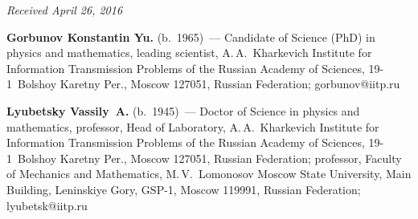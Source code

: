 \begin{multicols}{2}
{{ }
 }

\end{multicols}

\vspace*{-9pt}

\hfill{\small\textit{Received April 26, 2016}}

\pagebreak

\Contr

\noindent
\textbf{Gorbunov Konstantin Yu.} (b.\ 1965)~--- Candidate of Science (PhD) in 
physics and mathematics, leading scientist, A.\,A.~Kharkevich Institute for Information Transmission 
Problems of the Russian Academy of Sciences, 
\mbox{19-1}~Bolshoy Karetny Per., Moscow 127051, Russian Federation; 
\mbox{gorbunov@iitp.ru}

\vspace*{3pt}

\noindent
\textbf{Lyubetsky Vassily~A.} (b.\ 1945)~--- Doctor of Science in physics and 
mathematics, professor, Head of Laboratory, A.\,A.~Kharkevich Institute for Information 
Transmission Problems of the Russian Academy of Sciences, 
\mbox{19-1}~Bolshoy Karetny Per., Moscow 127051, Russian Federation; professor, 
Faculty of Mechanics and Mathematics, M.\,V.~Lomonosov Moscow State 
University, Main Building, Leninskiye Gory, GSP-1, Moscow 119991, Russian 
Federation; \mbox{lyubetsk@iitp.ru}
\label{end\stat}


\renewcommand{\bibname}{\protect\rm Литература} 
